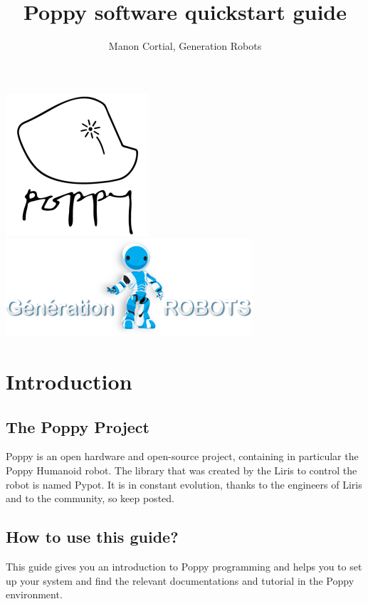 \documentclass{article}
\begin{document}
\title{Poppy software quickstart guide}
\author{Manon Cortial, Generation Robots}

\maketitle

  \includegraphics[height=0.22\textwidth]{img/poppy-logo} \hfill \includegraphics[height=0.22\textwidth]{img/GR-logo}

\section{Introduction}

\subsection{The Poppy Project}

Poppy is an open hardware and open-source project, containing in particular the Poppy Humanoid robot. The library that was created by the Liris to control the robot is named Pypot. It is in constant evolution, thanks to the engineers of Liris and to the community, so keep posted.



\subsection{How to use this guide?}

This guide gives you an introduction to Poppy programming and helps you to set up your system and find the relevant documentations and tutorial in the Poppy environment.
\end{document}
